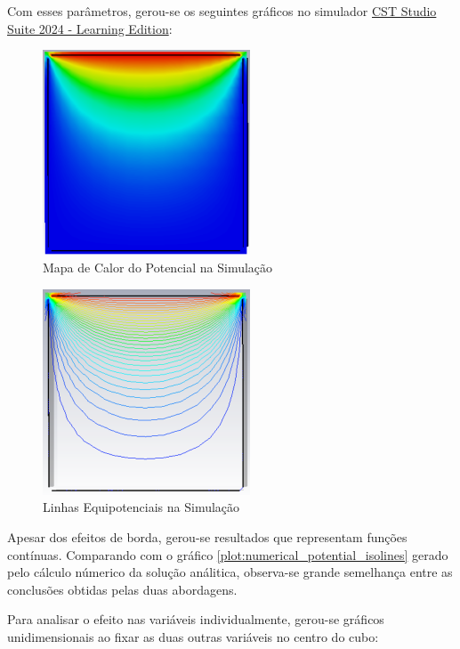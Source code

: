 \documentclass{report}
\begin{document}
Com esses parâmetros, gerou-se os seguintes gráficos no simulador \href{https://www.3ds.com/edu/education/students/solutions/cst-le}{CST Studio Suite 2024 - Learning Edition}:

\begin{figure}[h!]
  \centering
  \includegraphics[width=0.55\textwidth]{images/plots/simulation_heatmap.png}
  \caption{\label{plot:simul_potential_heatmap} Mapa de Calor do Potencial na Simulação}
\end{figure}

\begin{figure}[h!]
  \centering
  \includegraphics[width=0.55\textwidth]{images/plots/simulation_isolines.png}
  \caption{\label{plot:simul_potential_isolines} Linhas Equipotenciais na Simulação}
\end{figure}

Apesar dos efeitos de borda, gerou-se resultados que representam funções contínuas. Comparando com o gráfico \ref{plot:numerical_potential_isolines} gerado pelo
cálculo númerico da solução análitica, observa-se grande semelhança entre as conclusões obtidas pelas duas abordagens.

Para analisar o efeito nas variáveis individualmente, gerou-se gráficos unidimensionais ao fixar as duas outras variáveis no centro
do cubo:
\end{document}
